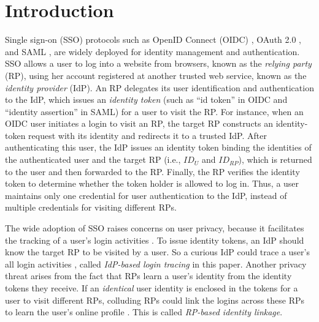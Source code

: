 \section{Introduction}
\label{sec:intro}
Single sign-on (SSO) protocols such as OpenID Connect (OIDC) \cite{OpenIDConnect}, OAuth 2.0 \cite{rfc6749}, and SAML \cite{SAML, SAMLIdentifier}, are widely deployed for identity management and authentication.
SSO allows a user to log into a website from browsers,
 known as the \emph{relying party} (RP), using her account registered at another trusted web service, known as the \emph{identity provider} (IdP).
An RP delegates its user identification and authentication to the IdP, which issues an \emph{identity token} (such as ``id token'' in OIDC and ``identity assertion'' in SAML) for a user to visit the RP.
For instance, when an OIDC user initiates a login to visit an RP,
the target RP constructs an identity-token request with its identity and redirects it to a trusted IdP.
After authenticating this user, the IdP issues an identity token binding the identities of the authenticated user and the target RP (i.e., $ID_U$ and $ID_{RP}$), which is returned to the user and then forwarded to the RP.
Finally, the RP verifies the identity token to determine whether the token holder is allowed to log in. Thus, a user maintains only one credential for user authentication to the IdP, instead of multiple credentials for visiting different RPs.


The wide adoption of SSO raises concerns on user privacy, because it facilitates the tracking of a user's login activities  \cite{NIST2017draft, SPRESSO, BrowserID, maler2008venn}. %
To issue identity tokens, an IdP should know the target RP to be visited by a user.
So a curious IdP could trace a user's all login activities
 \cite{BrowserID, SPRESSO},
called {\em IdP-based login tracing} in this paper.
Another privacy threat arises from the fact that RPs learn a user's identity from the identity tokens they receive.
If an \emph{identical} user identity is enclosed in the tokens for a user to visit different RPs, colluding RPs could link the logins across these RPs %
to learn the user's online profile \cite{maler2008venn, FirefoxAccount}.
This is called {\em RP-based identity linkage}. %

